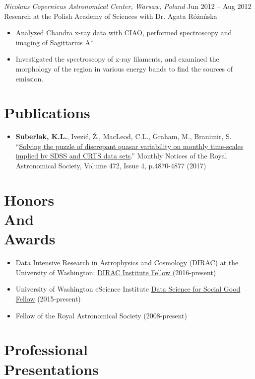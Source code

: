 \documentclass[margin]{res}
\begin{document}
\begin{resume}
{\sl Nicolaus Copernicus Astronomical Center, Warsaw, Poland}  \hfill   Jun 2012 -- Aug 2012 \\
Research at the Polish Academy of Sciences with Dr. Agata R\'{o}\.{z}a\'{n}ska
\begin{itemize}
	\item Analyzed Chandra x-ray data with CIAO, performed  spectroscopy and imaging of Sagittarius A*
	\item Investigated the spectroscopy of x-ray filaments, and examined the morphology of the region in various energy bands to find the sources of emission.
\end{itemize}



\section{Publications}
\begin{itemize}   
\item \textbf{Suberlak, K.L.}, Ivezi\'c, \v{Z}., MacLeod, C.L., Graham, M., Branimir, S. ``\href{https://doi.org/10.1093/mnras/stx2310}{Solving the puzzle of discrepant quasar variability on monthly time-scales implied by SDSS and CRTS data sets}.'' Monthly Notices of the Royal Astronomical Society, Volume 472, Issue 4, p.4870-4877 (2017)

\end{itemize}


\section{Honors\\And\\Awards} 
\begin{itemize}  

\item Data Intensive Research in Astrophysics and Cosmology (DIRAC) at the University of Washington: \href{https://dirac.astro.washington.edu}{DIRAC Institute Fellow }(2016-present) 
\item University of Washington eScience Institute \href{https://escience.washington.edu/dssg/}{Data Science for Social Good Fellow} (2015-present)
\item Fellow of the Royal Astronomical Society (2008-present) \\
\end{itemize}
                 


\section{Professional\\ Presentations} 
\begin{itemize}  %


\end{itemize}
\end{resume}
\end{document}

